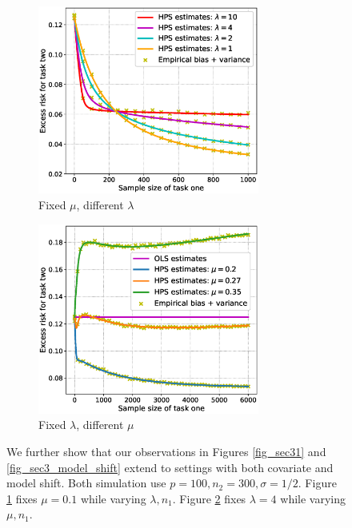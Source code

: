 \begin{figure}[!t]
	\begin{subfigure}[b]{0.5\textwidth}
		\centering
		\includegraphics[width=0.8\textwidth]{figures/covariate_and_model_shift_a.eps}
		\caption{Fixed $\mu$, different $\lambda$}
		\label{fig_sec3_cov_mo_a}
	\end{subfigure}
	\begin{subfigure}[b]{0.5\textwidth}
		\centering
		\includegraphics[width=0.8\textwidth]{figures/covariate_and_model_shift_b.eps}
		\caption{Fixed $\lambda$, different $\mu$}
		\label{fig_sec3_cov_mo_b}
	\end{subfigure}
	\caption{We further show that our observations in Figures \ref{fig_sec31} and \ref{fig_sec3_model_shift} extend to settings with both covariate and model shift.
	Both simulation use $p = 100, n_2 = 300, \sigma = 1/2$.
	Figure \ref{fig_sec3_cov_mo_a} fixes $\mu = 0.1$ while varying $\lambda, n_1$.
	Figure \ref{fig_sec3_cov_mo_b} fixes $\lambda = 4$ while varying $\mu, n_1$.}
	\label{fig_sec33}
\end{figure}


